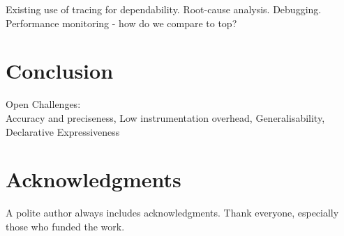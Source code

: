 \documentclass[letterpaper,twocolumn,10pt]{article}
\begin{document}
Existing use of tracing for dependability.\newline
Root-cause analysis. Debugging. Performance monitoring - how do we compare to
top?

\section{Conclusion}
Open Challenges:\\
Accuracy and preciseness,
Low instrumentation overhead,
Generalisability,
Declarative Expressiveness

\section{Acknowledgments}

A polite author always includes acknowledgments.  Thank everyone,
especially those who funded the work.



{\footnotesize 
}
\end{document}
